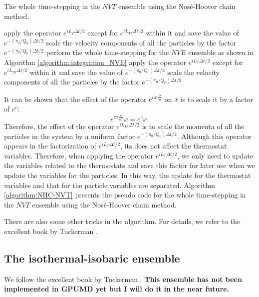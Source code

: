 \documentclass[12pt,a4paper]{report}
\begin{document}
\begin{algorithm}[htb]
\caption{The whole time-stepping in the $NVT$ ensemble using the Nos\'{e}-Hoover chain method. }
\label{algorithm:NHC-NVT}
\begin{algorithmic}[1]
\State apply the operator $e^{iL_{T}\Delta t/2}$ except for $e^{iL_{T3}\Delta t/2}$ within it and save the value of $e^{-(\pi_0/Q_0)\Delta t/2}$
\State scale the velocity components of all the particles by the factor $e^{-(\pi_0/Q_0)\Delta t/2}$
\State perform the whole time-stepping for the $NVE$ ensemble as shown in Algorithm \ref{algorithm:integration_NVE}
\State apply the operator $e^{iL_{T}\Delta t/2}$ except for $e^{iL_{T3}\Delta t/2}$ within it and save the value of $e^{-(\pi_0/Q_0)\Delta t/2}$
\State scale the velocity components of all the particles by the factor $e^{-(\pi_0/Q_0)\Delta t/2}$
\end{algorithmic}
\end{algorithm}


It can be shown that the effect of the operator $e^{cx\frac{\partial}{\partial x}}$ on $x$ is to scale it by a factor of $e^c$:
\begin{equation}
e^{cx\frac{\partial}{\partial x}} x = e^c x.
\end{equation}
Therefore, the effect of the operator $e^{iL_{T3}\Delta t/2}$ is to scale the momenta of all the particles in the system by a uniform factor $e^{-(\pi_0/Q_0)\Delta t/2}$. Although this operator appears in the factorization of $e^{iL_{T}\Delta t/2}$, its does not affect the thermostat variables. Therefore, when applying the operator $e^{iL_{T}\Delta t/2}$, we only need to update the variables related to the thermostats and save this factor for later use when we update the variables for the particles. In this way, the update for the thermostat variables and that for the particle variables are separated. Algorithm \ref{algorithm:NHC-NVT} presents the pseudo code for the whole time-stepping in the $NVT$ ensemble using the Nos\'{e}-Hoover chain method.

There are also some other tricks in the algorithm. For details, we refer to the excellent book by Tuckerman \cite{tuckerman2010}.

\subsection{The isothermal-isobaric ensemble}

We follow the excellent book by Tuckerman \cite{tuckerman2010}. \textbf{This ensemble has not been implemented in GPUMD yet but I will do it in the near future.}
\end{document}
